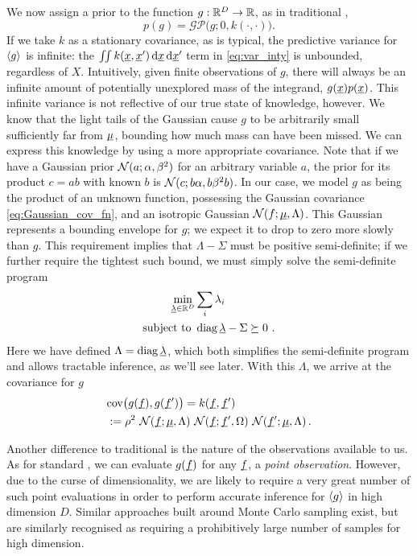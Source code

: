 \documentclass[twoside]{article}
\begin{document}
We now assign a \gp prior 
to the function $g: \mathbb{R}^D \to \mathbb{R}$, as in traditional \bq,
\begin{equation}
 p(g) = \mathcal{GP}\bigl(g; 0 , k(\cdot,\cdot)\bigr).
\end{equation}
 If we take $k$ as a stationary covariance, as is typical, the predictive variance for $\langle g \rangle$ is infinite: the $\iint k(\underline{\smash{x}},\underline{\smash{x}}')\,\mathrm{d}\underline{\smash{x}}\,\mathrm{d} \underline{\smash{x}}'$ term in \eqref{eq:var_inty} is unbounded, regardless of $X$. Intuitively, given finite observations of $g$, there will always be an infinite amount of potentially unexplored mass of the integrand, $g(\underline{\smash{x}})p(\underline{\smash{x}})$. This infinite variance is not reflective of our true state of knowledge, however. We know that the light tails of the Gaussian cause $g$ to be arbitrarily small sufficiently far from $\underline{\smash{\mu}}$, bounding how much mass can have been missed. We can express this knowledge by using a more appropriate covariance. Note that if we have a Gaussian prior $\mathcal{N}(a;\alpha,\beta^2)$ for an arbitrary variable $a$, the prior for its product $c = a b$ with known $b$ is $\mathcal{N}(c;b \alpha,b \beta^2 b)$. In our case, we model $g$ as being the product of an unknown function, possessing the Gaussian covariance \eqref{eq:Gaussian_cov_fn}, and an isotropic Gaussian $\mathcal{N}(f;\underline{\smash{\mu}},\Lambda)$. This Gaussian represents a bounding envelope for $g$; we expect it to drop to zero more slowly than $g$. This requirement implies that $\Lambda - \Sigma$ must be positive semi-definite; if we further require the tightest such bound, we must simply solve the semi-definite program
\begin{align}
 \min_{\underline{\smash{\lambda}}\in\mathbb{R}^D} & \sum_i \lambda_i\\
\text{subject to } & \operatorname{diag}{\underline{\smash{\lambda}}} - \Sigma \succeq 0~.
\end{align}
Here we have defined $\Lambda = \operatorname{diag} \underline{\smash{\lambda}}$, which both simplifies the semi-definite program and allows tractable inference, as we'll see later. With this $\Lambda$, we arrive at the covariance for $g$
\begin{align}
 & \text{cov}\bigl(g(\underline{\smash{f}}), g(\underline{\smash{f}}')\bigr) = k(\underline{\smash{f}}, \underline{\smash{f}}')\nonumber\\ & := \rho^2~\mathcal{N}(\underline{\smash{f}};\underline{\smash{\mu}},\Lambda)~\mathcal{N}(\underline{\smash{f}};\underline{\smash{f}}',\Omega)~\mathcal{N}(\underline{\smash{f}}';\underline{\smash{\mu}},\Lambda)\,.
\end{align}

Another difference to traditional  is the nature of the observations available to us. As for standard , we can evaluate $g(\underline{\smash{f}})$ for any $\underline{\smash{f}}$, a \emph{point observation}. However, due to the curse of dimensionality, we are likely to require a very great number of such point evaluations in order to perform accurate inference for $\langle g \rangle$ in high dimension $D$. Similar approaches built around Monte Carlo sampling \citep{genz1992numerical} exist, but are similarly recognised as requiring a prohibitively large number of samples for high dimension. 
\end{document}
